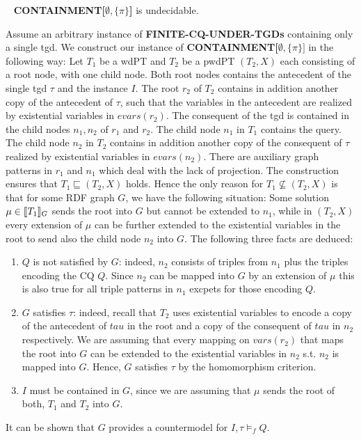 \begin{theorem}\label{cemptypi}~\cite{pichler2014containment}
	\textbf{CONTAINMENT[$\emptyset,\{\pi\}$]} is undecidable.
\end{theorem}
\begin{proofidea}
	Assume an arbitrary instance of \textbf{FINITE-CQ-UNDER-TGDs} containing only a
	single tgd. We construct our instance of
	\textbf{CONTAINMENT[$\emptyset,\{\pi\}]$} in the following way:
	Let $T_1$ be a wdPT and $T_2$ be a pwdPT $(T_2,X)$ each consisting of a root
	node, with one child node. Both root nodes contains the antecedent of the
	single tgd $\tau$ and the instance $I$.
	The root $r_2$ of $T_2$ contains in addition another copy of the antecedent
	of $\tau$, such that the variables in the antecedent are realized by
	existential variables in $evars(r_2)$.
	The consequent of the tgd is contained in the child nodes $n_1,n_2$ of $r_1$ and
	$r_2$. The child node $n_1$ in $T_1$ contains the query. The child node
	$n_2$ in $T_2$ contains in addition another copy of the consequent of $\tau$
	realized by existential variables in $evars(n_2)$.
	There are auxiliary graph patterns in $r_1$ and $n_1$ which deal with the
	lack of projection. 
	The construction ensures that $T_1 \sqsubseteq(T_2,X)$ holds. 
	Hence the only reason for $T_1 \not\subseteq (T_2,X)$ is that for some RDF
	graph $G$, we have the following situation: Some solution $\mu \in \llbracket
	T_1\rrbracket_G$ sends the root into $G$ but cannot be extended to $n_1$, while in
	$(T_2,X)$ every extension of $\mu$ can be further extended to the existential 
	variables in the root
	to send also the child node $n_2$ into $G$.
	The following three facts are deduced:
	\begin{enumerate}
		\item $Q$ is not satisfied by $G$: indeed, $n_2$ consists of triples from
			$n_1$ plus the triples encoding the CQ $Q$. Since $n_2$ can be
			mapped into $G$ by an extension of $\mu$ this is also true for all
			triple patterns in $n_1$ excpets for those encoding $Q$.
		\item $G$ satisfies $\tau$: indeed, recall that $T_2$ uses existential
			variables to encode a copy of the antecedent of $tau$ in the root
			and a copy of the consequent of $tau$ in $n_2$ respectively. We are
			assuming that every mapping on $vars(r_2)$ that maps the root into
			$G$ can be extended to the existential variables in $n_2$ s.t. $n_2$
			is mapped into $G$. Hence, $G$ satisfies $\tau$ by the homomorphism
			criterion.
		\item $I$ must be contained in $G$, since we are assuming that $\mu$
			sends the root of both, $T_1$ and $T_2$ into $G$.
	\end{enumerate}
	It can be shown that $G$ provides a countermodel for $I,\tau \models_f Q$.
\end{proofidea}

